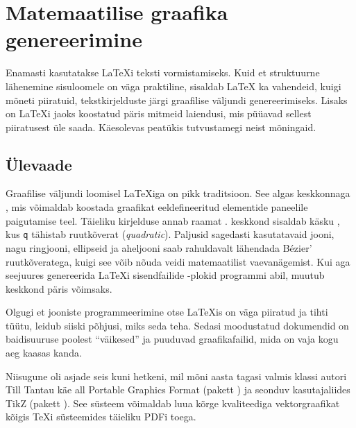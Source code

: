 \setcounter{chapter}{4}
\newcommand{\graphicscompanion}{\glqq The \LaTeX{} Graphics Companion\grqq~\cite{graphicscompanion}}
\newcommand{\hobby}{\glqq A User's Manual for \MP\grqq~\cite{metapost}}
\newcommand{\hoenig}{\glqq \TeX{} Unbound\grqq~\cite{unbound}}
\newcommand{\graphicsinlatex}{\glqq Graphics in \LaTeXe\grqq~\cite{ursoswald}}

\chapter{Matemaatilise graafika genereerimine}
\label{chap:graphics}

\begin{intro}
Enamasti kasutatakse \LaTeX i teksti vormistamiseks. Kuid et struktuurne
lähenemine sisuloomele on väga praktiline, sisaldab \LaTeX{} ka
vahendeid, kuigi mõneti piiratuid, tekstkirjelduste järgi graafilise
väljundi genereerimiseks. Lisaks on \LaTeX i jaoks koostatud päris
mitmeid laiendusi, mis püüavad sellest piiratusest üle saada. Käesolevas
peatükis tutvustamegi neist mõningaid.
\end{intro}

\section{Ülevaade}

Graafilise väljundi loomisel \LaTeX iga on pikk traditsioon. See algas
keskkonnaga , mis võimaldab koostada graafikat
eeldefineeritud elementide paneelile paigutamise teel. Täieliku
kirjelduse annab raamat \manual. \LaTeXe{} keskkond 
sisaldab käsku , kus \texttt{q} tähistab ruutkõverat
(\emph{quadratic}). Paljusid sagedasti kasutatavaid jooni, nagu
ringjooni, ellipseid ja aheljooni saab rahuldavalt lähendada B\'ezier'
ruutkõveratega, kuigi see võib nõuda veidi matemaatilist vaevanägemist.
Kui aga seejuures genereerida \LaTeX i sisendfailide -plokid
programmi abil, muutub keskkond  päris võimsaks.

Olgugi et jooniste programmeerimine otse \LaTeX is on väga piiratud ja
tihti tüütu, leidub siiski põhjusi, miks seda teha. Sedasi moodustatud
dokumendid on baidisuuruse poolest "`väikesed"' ja puuduvad
graafikafailid, mida on vaja kogu aeg kaasas kanda.

Niisugune oli asjade seis kuni hetkeni, mil mõni aasta tagasi valmis
klassi  autori Till Tantau käe all
Portable Graphics Format (pakett ) ja seonduv kasutajaliides
TikZ (pakett ). See süsteem võimaldab luua kõrge kvaliteediga
vektorgraafikat kõigis \TeX i süsteemides täieliku PDFi toega.

